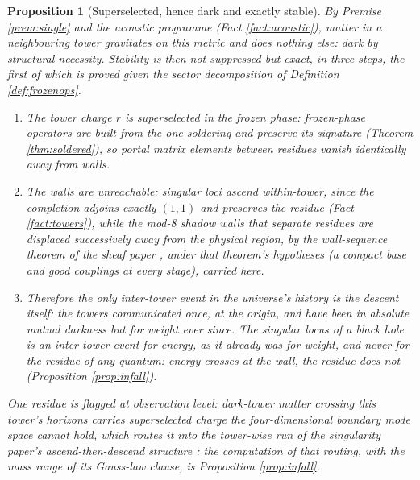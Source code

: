 \documentclass[11pt]{article}
\newtheorem{proposition}[theorem]{Proposition}
\theoremstyle{definition}
\begin{document}
\begin{proposition}[Superselected, hence dark and exactly stable]\label{prop:stable}
By Premise \ref{prem:single} and the acoustic programme (Fact \ref{fact:acoustic}), matter in a neighbouring tower gravitates on this metric and does nothing else: dark by structural necessity. Stability is then not suppressed but exact, in three steps, the first of which is proved given the sector decomposition of Definition \ref{def:frozenops}.
\begin{enumerate}
\item The tower charge $r$ is superselected in the frozen phase: frozen-phase operators are built from the one soldering and preserve its signature (Theorem \ref{thm:soldered}), so portal matrix elements between residues vanish identically away from walls.
\item The walls are unreachable: singular loci ascend within-tower, since the completion adjoins exactly $(1,1)$ and preserves the residue (Fact \ref{fact:towers}), while the mod-8 shadow walls that separate residues are displaced successively away from the physical region, by the wall-sequence theorem of the sheaf paper \cite[\S5]{ButlerT4}, under that theorem's hypotheses (a compact base and good couplings at every stage), carried here.
\item Therefore the only inter-tower event in the universe's history is the descent itself: the towers communicated once, at the origin, and have been in absolute mutual darkness but for weight ever since. The singular locus of a black hole is an inter-tower event for energy, as it already was for weight, and never for the residue of any quantum: energy crosses at the wall, the residue does not (Proposition \ref{prop:infall}).
\end{enumerate}
One residue is flagged at observation level: dark-tower matter crossing this tower's horizons carries superselected charge the four-dimensional boundary mode space cannot hold, which routes it into the tower-wise run of the singularity paper's ascend-then-descend structure \cite{ButlerT5}; the computation of that routing, with the mass range of its Gauss-law clause, is Proposition \ref{prop:infall}.
\end{proposition}
\end{document}
